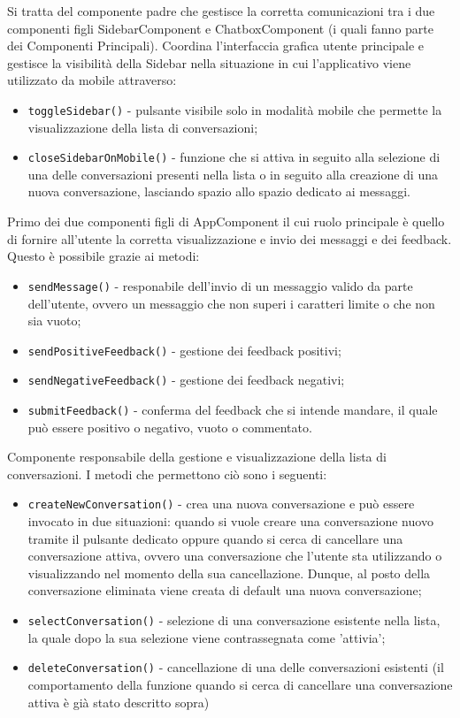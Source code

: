 Si tratta del componente padre che gestisce la corretta comunicazioni tra i due componenti figli SidebarComponent e ChatboxComponent (i quali fanno parte dei Componenti Principali). Coordina l'interfaccia grafica utente principale e gestisce la visibilità della Sidebar nella situazione in cui l'applicativo viene utilizzato da mobile attraverso:
\begin{itemize}
    \item \texttt{toggleSidebar()} - pulsante visibile solo in modalità mobile che permette la visualizzazione della lista di conversazioni;
    \item \texttt{closeSidebarOnMobile()} - funzione che si attiva in seguito alla selezione di una delle conversazioni presenti nella lista o in seguito alla creazione di una nuova conversazione, lasciando spazio allo spazio dedicato ai messaggi. 
\end{itemize}
Primo dei due componenti figli di AppComponent il cui ruolo principale è quello di fornire all'utente la corretta visualizzazione e invio dei messaggi e dei feedback. Questo è possibile grazie ai metodi:
\begin{itemize}
    \item \texttt{sendMessage()} - responabile dell'invio di un messaggio valido da parte dell'utente, ovvero un messaggio che non superi i caratteri limite o che non sia vuoto;
    \item \texttt{sendPositiveFeedback()} - gestione dei feedback positivi;
    \item \texttt{sendNegativeFeedback()} - gestione dei feedback negativi;
    \item \texttt{submitFeedback()} - conferma del feedback che si intende mandare, il quale può essere positivo o negativo, vuoto o commentato.
\end{itemize}
Componente responsabile della gestione e visualizzazione della lista di conversazioni. I metodi che permettono ciò sono i seguenti:
\begin{itemize}
    \item \texttt{createNewConversation()} - crea una nuova conversazione e può essere invocato in due situazioni: quando si vuole creare una conversazione nuovo tramite il pulsante dedicato oppure quando si cerca di cancellare una conversazione attiva, ovvero una conversazione che l'utente sta utilizzando o visualizzando nel momento della sua cancellazione. Dunque, al posto della conversazione eliminata viene creata di default una nuova conversazione;
    \item \texttt{selectConversation()} - selezione di una conversazione esistente nella lista, la quale dopo la sua selezione viene contrassegnata come 'attivia';
    \item \texttt{deleteConversation()} - cancellazione di una delle conversazioni esistenti (il comportamento della funzione quando si cerca di cancellare una conversazione attiva è già stato descritto sopra)
\end{itemize}
